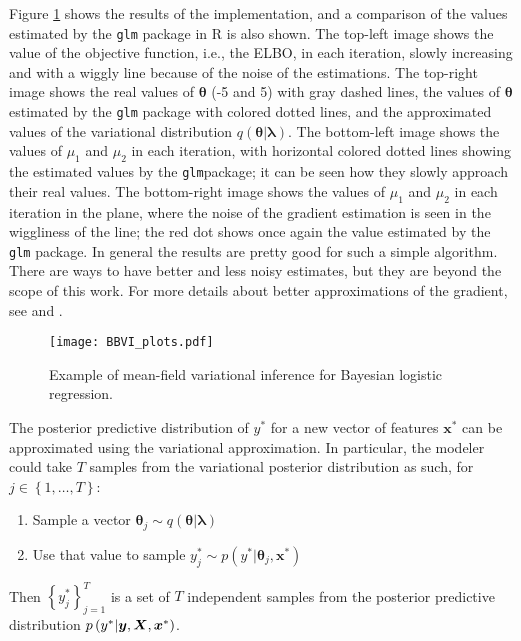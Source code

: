 Figure \ref{fig:BBVI_plots} shows the results of the implementation, and a comparison of the values estimated by the \texttt{glm} package in R is also shown. The top-left image shows the value of the objective function, i.e., the ELBO, in each iteration, slowly increasing and with a wiggly line because of the noise of the estimations. The top-right image shows the real values of $\boldsymbol{\theta}$ (-5 and 5) with gray dashed lines, the values of $\boldsymbol{\theta}$ estimated by the \texttt{glm} package with colored dotted lines, and the approximated values of the variational distribution $q(\boldsymbol{\theta} | \boldsymbol{\lambda})$. The bottom-left image shows the values of $\mu_1$ and $\mu_2$ in each iteration, with horizontal colored dotted lines showing the estimated values by the \texttt{glm}package; it can be seen how they slowly approach their real values. The bottom-right image shows the values of $\mu_1$ and $\mu_2$ in each iteration in the plane, where the noise of the gradient estimation is seen in the wiggliness of the line; the red dot shows once again the value estimated by the \texttt{glm} package. In general the results are pretty good for such a simple algorithm. There are ways to have better and less noisy estimates, but they are beyond the scope of this work. For more details about better approximations of the gradient, see \cite{kucukelbir2017automatic} and \cite{ranganath2014black}.

\begin{figure}[H]
    \centering
    \texttt{[image: BBVI\_plots.pdf]}
    \caption{Example of mean-field variational inference for Bayesian logistic regression.}
    \label{fig:BBVI_plots}
\end{figure}

The posterior predictive distribution of $y^*$ for a new vector of features $\boldsymbol{x}^*$ can be approximated using the variational approximation. In particular, the modeler could take $T$ samples from the variational posterior distribution as such, for $j \in \left\{ 1, \ldots, T \right\}$:
\begin{enumerate}
  \item Sample a vector $\boldsymbol{\theta}_j \sim q(\boldsymbol{\theta} | \boldsymbol{\lambda})$
  \item Use that value to sample $y_j^* \sim p(y^* | \boldsymbol{\theta}_j, \boldsymbol{x}^*)$
\end{enumerate}

Then $\left\{ y_j^* \right\}_{j = 1}^T$ is a set of $T$ independent samples from the posterior predictive distribution $p\left( y^* | \boldsymbol{y}, \boldsymbol{X}, \boldsymbol{x}^* \right)$.

